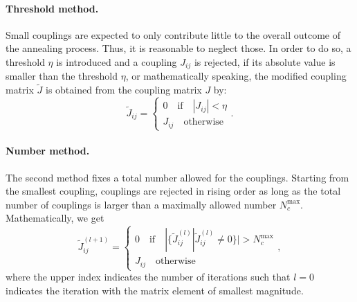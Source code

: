 \documentclass{article}
\begin{document}
	\paragraph{Threshold method.} Small couplings are expected to only contribute little to the overall outcome of the annealing process. Thus, it is reasonable to neglect those. In order to do so, a threshold $\eta$ is introduced and a coupling $J_{ij}$ is rejected, if its absolute value is smaller than the threshold $\eta$, or mathematically speaking, the modified coupling matrix $\tilde{J}$ is obtained from the coupling matrix $J$ by:
	\begin{equation}
		\tilde{J}_{ij} = \begin{cases}
			0 \quad\text{if}\quad |J_{ij}|<\eta \\ J_{ij} \quad\text{otherwise} 
		\end{cases}.
	\end{equation}
	
	\paragraph{Number method.} The second method fixes a total number allowed for the couplings. Starting from the smallest coupling, couplings are rejected in rising order as long as the total number of couplings is larger than a maximally allowed number $N_c^\text{max}$. Mathematically, we get
	\begin{equation}
		\tilde{J}_{ij}^{(l+1)} = \begin{cases}
			0 \quad\text{if}\quad |\{\tilde{J}_{ij}^{(l)}|\tilde{J}_{ij}^{(l)}\neq0\}|>N_c^\text{max} \\ J_{ij} \quad\text{otherwise} 
		\end{cases},
	\end{equation}
	where the upper index indicates the number of iterations such that $l=0$ indicates the iteration with the matrix element of smallest magnitude.
\end{document}

